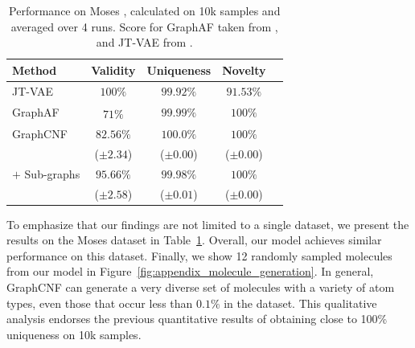 \begin{table}[t]
	\caption[Molecule generation results on the Moses dataset]{Performance on Moses \cite{MosesDataset}, calculated on 10k samples and averaged over 4 runs. Score for GraphAF taken from \citet{GraphAF}, and JT-VAE from \citet{MosesDataset}. }
	\label{tab:result_table_molecule_generation_moses}
	\centering
	\begin{tabular}{lcccc}
		\toprule
		\textbf{Method} & \textbf{Validity} & \textbf{Uniqueness} & \textbf{Novelty}\\
		\midrule
		JT-VAE \cite{JunctionTreeVAE} & $100\%$ & $99.92\%$ & $91.53\%$ \\
		GraphAF \cite{GraphAF} & $71\%$\textsuperscript{\dag} & $99.99\%$ & $100\%$ \\
		\midrule
		GraphCNF & $82.56\%$  & $100.0\%$ & $100\%$ \\
		& \footnotesize{($\pm2.34$)} & \footnotesize{($\pm0.00$)} & \footnotesize{($\pm0.00$)} \\[3.5pt]
		$+$ Sub-graphs & $95.66\%$  & $99.98\%$ & $100\%$ & \\
		& \footnotesize{($\pm2.58$)} & \footnotesize{($\pm0.01$)} & \footnotesize{($\pm0.00$)} \\
		\bottomrule
	\end{tabular}
\end{table}

To emphasize that our findings are not limited to a single dataset, we present the results on the Moses dataset in Table~\ref{tab:result_table_molecule_generation_moses}. Overall, our model achieves similar performance on this dataset.
Finally, we show 12 randomly sampled molecules from our model in Figure~\ref{fig:appendix_molecule_generation}. 
In general, GraphCNF can generate a very diverse set of molecules with a variety of atom types, even those that occur less than $0.1\%$ in the dataset. 
This qualitative analysis endorses the previous quantitative results of obtaining close to 100\% uniqueness on 10k samples. 

